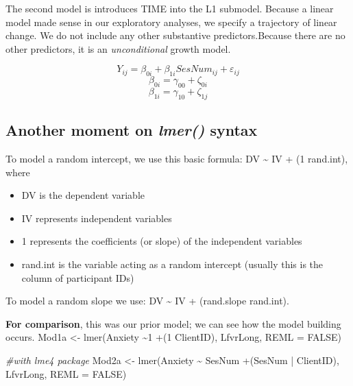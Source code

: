 \documentclass[
  english,
]{book}
\newenvironment{Shaded}{\begin{snugshade}}{\end{snugshade}}
\newcommand{\AttributeTok}[1]{\textcolor[rgb]{0.77,0.63,0.00}{#1}}
\newcommand{\CommentTok}[1]{\textcolor[rgb]{0.56,0.35,0.01}{\textit{#1}}}
\newcommand{\ConstantTok}[1]{\textcolor[rgb]{0.00,0.00,0.00}{#1}}
\newcommand{\FunctionTok}[1]{\textcolor[rgb]{0.00,0.00,0.00}{#1}}
\newcommand{\NormalTok}[1]{#1}
\newcommand{\OtherTok}[1]{\textcolor[rgb]{0.56,0.35,0.01}{#1}}
\newcommand{\SpecialCharTok}[1]{\textcolor[rgb]{0.00,0.00,0.00}{#1}}
\providecommand{\tightlist}{%
  \setlength{\itemsep}{0pt}\setlength{\parskip}{0pt}}
\begin{document}
The second model is introduces TIME into the L1 submodel. Because a linear model made sense in our exploratory analyses, we specify a trajectory of linear change. We do not include any other substantive predictors.Because there are no other predictors, it is an \emph{unconditional} growth model.

\[Y_{ij}=\beta _{0i}+\beta _{1i}SesNum_{ij}+\varepsilon _{ij}\]
\[\beta _{0i}=\gamma _{00} + \zeta _{0i}\]
\[\beta _{1i}=\gamma _{10} + \zeta _{1j}\]

\hypertarget{another-moment-on-lmer-syntax}{%
\subsection{\texorpdfstring{Another moment on \emph{lmer()} syntax}{Another moment on lmer() syntax}}\label{another-moment-on-lmer-syntax}}

To model a random intercept, we use this basic formula: DV \textasciitilde{} IV + (1 \textbar{} rand.int), where

\begin{itemize}
\tightlist
\item
  DV is the dependent variable
\item
  IV represents independent variables
\item
  1 represents the coefficients (or slope) of the independent variables
\item
  rand.int is the variable acting as a random intercept (usually this is the column of participant IDs)
\end{itemize}

To model a random slope we use: DV \textasciitilde{} IV + (rand.slope \textbar{} rand.int).

\textbf{For comparison}, this was our prior model; we can see how the model building occurs.
Mod1a \textless- lmer(Anxiety \textasciitilde1 +(1 \textbar{} ClientID), LfvrLong, REML = FALSE)

\begin{Shaded}
\begin{Highlighting}[]
\CommentTok{\#with lme4 package}
\NormalTok{Mod2a }\OtherTok{\textless{}{-}} \FunctionTok{lmer}\NormalTok{(Anxiety }\SpecialCharTok{\textasciitilde{}}\NormalTok{ SesNum }\SpecialCharTok{+}\NormalTok{(SesNum }\SpecialCharTok{|}\NormalTok{ ClientID), LfvrLong, }\AttributeTok{REML =} \ConstantTok{FALSE}\NormalTok{)}
\end{Highlighting}
\end{Shaded}
\end{document}
